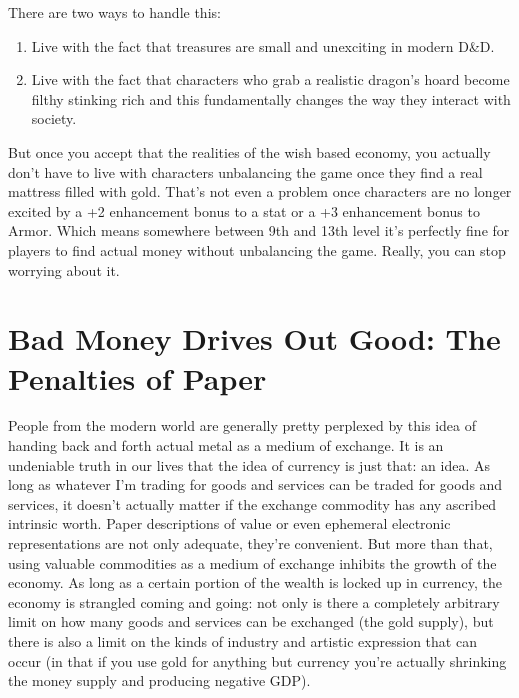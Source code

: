 There are two ways to handle this:
\begin{enumerate}\itemspace
   \item Live with the fact that treasures are small and unexciting in modern D\&D.
   \item Live with the fact that characters who grab a realistic dragon's hoard become filthy stinking rich and this fundamentally changes the way they interact with society.
\end{enumerate}


But once you accept that the realities of the wish based economy, you actually don't have to live with characters unbalancing the game once they find a real mattress filled with gold. That's not even a problem once characters are no longer excited by a +2 enhancement bonus to a stat or a +3 enhancement bonus to Armor. Which means somewhere between 9th and 13th level it's perfectly fine for players to find actual money without unbalancing the game. Really, you can stop worrying about it.

\section{Bad Money Drives Out Good: The Penalties of Paper}

People from the modern world are generally pretty perplexed by this idea of handing back and forth actual metal as a medium of exchange. It is an undeniable truth in our lives that the idea of currency is just that: an idea. As long as whatever I'm trading for goods and services can be traded for goods and services, it doesn't actually matter if the exchange commodity has any ascribed intrinsic worth. Paper descriptions of value or even ephemeral electronic representations are not only adequate, they're convenient. But more than that, using valuable commodities as a medium of exchange inhibits the growth of the economy. As long as a certain portion of the wealth is locked up in currency, the economy is strangled coming and going: not only is there a completely arbitrary limit on how many goods and services can be exchanged (the gold supply), but there is also a limit on the kinds of industry and artistic expression that can occur (in that if you use gold for anything but currency you're actually shrinking the money supply and producing negative GDP).

